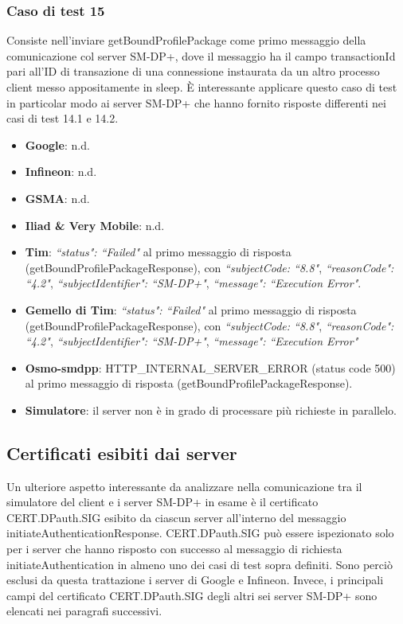 \documentclass[10pt, oneside]{book}
\begin{document}
\subsubsection{Caso di test 15}
Consiste nell'inviare getBoundProfilePackage come primo messaggio della comunicazione col server SM-DP+, dove il messaggio ha il campo transactionId pari all'ID di transazione di una connessione instaurata da un altro processo client messo appositamente in sleep. È interessante applicare questo caso di test in particolar modo ai server SM-DP+ che hanno fornito risposte differenti nei casi di test 14.1 e 14.2.
\begin{itemize}
\item \textbf{Google}: n.d.
\item \textbf{Infineon}: n.d.
\item \textbf{GSMA}: n.d.
\item \textbf{Iliad \& Very Mobile}: n.d.
\item \textbf{Tim}: \textit{``status": ``Failed"} al primo messaggio di risposta (getBoundProfilePackageResponse), con \textit{``subjectCode: ``8.8"}, \textit{``reasonCode": ``4.2"}, \textit{``subjectIdentifier": ``SM-DP+"}, \textit{``message": ``Execution Error"}.
\item \textbf{Gemello di Tim}: \textit{``status": ``Failed"} al primo messaggio di risposta (getBoundProfilePackageResponse), con \textit{``subjectCode: ``8.8"}, \textit{``reasonCode": ``4.2"}, \textit{``subjectIdentifier": ``SM-DP+"}, \textit{``message": ``Execution Error"}
\item \textbf{Osmo-smdpp}: HTTP\_INTERNAL\_SERVER\_ERROR (status code 500) al primo messaggio di risposta (getBoundProfilePackageResponse).
\item \textbf{Simulatore}: il server non è in grado di processare più richieste in parallelo.
\end{itemize}

\subsection{Certificati esibiti dai server}
Un ulteriore aspetto interessante da analizzare nella comunicazione tra il simulatore del client e i server SM-DP+ in esame è il certificato CERT.DPauth.SIG esibito da ciascun server all'interno del messaggio initiateAuthenticationResponse. CERT.DPauth.SIG può essere ispezionato solo per i server che hanno risposto con successo al messaggio di richiesta initiateAuthentication in almeno uno dei casi di test sopra definiti. Sono perciò esclusi da questa trattazione i server di Google e Infineon. Invece, i principali campi del certificato CERT.DPauth.SIG degli altri sei server SM-DP+ sono elencati nei paragrafi successivi.
\end{document}
